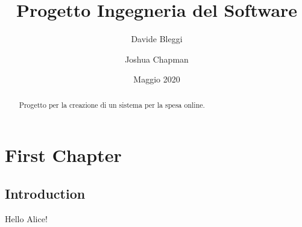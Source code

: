 \documentclass[12pt, a4paper]{article}
\title{Progetto Ingegneria del Software}
\author{
  Davide Bleggi
  \and
  Joshua Chapman
}
\date{Maggio 2020}
\begin{document}
\begin{titlepage}
  \maketitle
\end{titlepage}

\begin{abstract}
  Progetto per la creazione di un sistema per la spesa online.
\end{abstract}

\chapter{First Chapter}

\section{Introduction}
Hello Alice!
\end{document}
